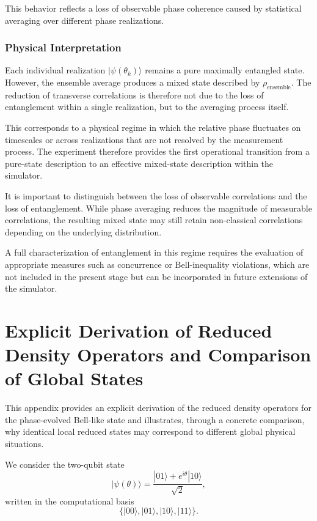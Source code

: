 \documentclass[a4paper]{article}
\begin{document}
This behavior reflects a loss of observable phase coherence caused by statistical averaging over different phase realizations.

\subsubsection{Physical Interpretation}

Each individual realization \( |\psi(\theta_k)\rangle \) remains a pure maximally entangled state. However, the ensemble average produces a mixed state described by \(\rho_{\mathrm{ensemble}}\). The reduction of transverse correlations is therefore not due to the loss of entanglement within a single realization, but to the averaging process itself.

This corresponds to a physical regime in which the relative phase fluctuates on timescales or across realizations that are not resolved by the measurement process. The experiment therefore provides the first operational transition from a pure-state description to an effective mixed-state description within the simulator.

It is important to distinguish between the loss of observable correlations and the loss of entanglement. While phase averaging reduces the magnitude of measurable correlations, the resulting mixed state may still retain non-classical correlations depending on the underlying distribution.

A full characterization of entanglement in this regime requires the evaluation of appropriate measures such as concurrence or Bell-inequality violations, which are not included in the present stage but can be incorporated in future extensions of the simulator.

\appendix
{\section{Explicit Derivation of Reduced Density Operators and Comparison of Global States}}

This appendix provides an explicit derivation of the reduced density operators for the phase-evolved Bell-like state and illustrates, through a concrete comparison, why identical local reduced states may correspond to different global physical situations.

We consider the two-qubit state
\[
|\psi(\theta)\rangle = \frac{|01\rangle + e^{i\theta}|10\rangle}{\sqrt{2}},
\]
written in the computational basis
\[
\{|00\rangle, |01\rangle, |10\rangle, |11\rangle\}.
\]
\end{document}
